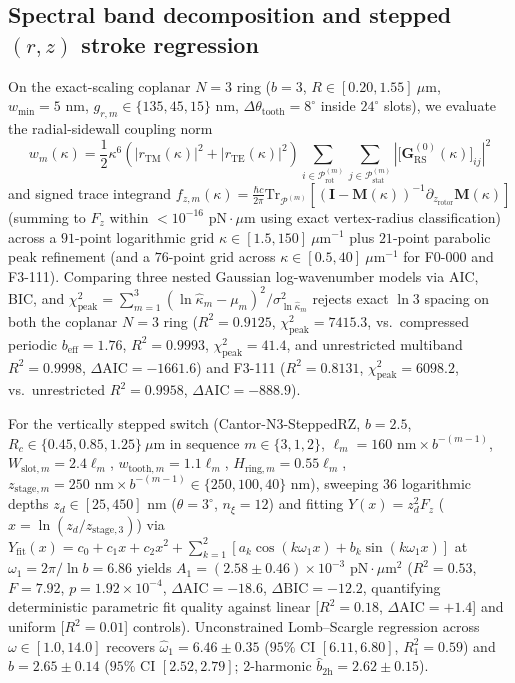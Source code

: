 \documentclass[11pt, a4paper]{article}
\begin{document}
\subsection*{Spectral band decomposition and stepped $(r,z)$ stroke regression}
On the exact-scaling coplanar $N=3$ ring ($b=3$, $R \in [0.20, 1.55]\ \mu\text{m}$, $w_{\min}=5\text{ nm}$, $g_{r,m} \in \{135, 45, 15\}\text{ nm}$, $\Delta\theta_{\mathrm{tooth}}=8^\circ$ inside $24^\circ$ slots), we evaluate the radial-sidewall coupling norm
\begin{equation}
w_m(\kappa) = \frac{1}{2}\kappa^6 \left( |r_{\mathrm{TM}}(\kappa)|^2 + |r_{\mathrm{TE}}(\kappa)|^2 \right) \sum_{i \in \mathcal{P}_{\mathrm{rot}}^{(m)}} \sum_{j \in \mathcal{P}_{\mathrm{stat}}^{(m)}} \left| \bigl[\mathbf{G}_{\mathrm{RS}}^{(0)}(\kappa)\bigr]_{ij} \right|^2
\label{eq:methods_spectral_subband}
\end{equation}
and signed trace integrand $f_{z,m}(\kappa) = \frac{\hbar c}{2\pi}\mathrm{Tr}_{\mathcal{P}^{(m)}}[(\mathbf{I}-\mathbf{M}(\kappa))^{-1}\partial_{z_{\mathrm{rotor}}}\mathbf{M}(\kappa)]$ (summing to $F_z$ within $<10^{-16}\text{ pN}\cdot\mu\text{m}$ using exact vertex-radius classification) across a $91$-point logarithmic grid $\kappa \in [1.5, 150]\ \mu\text{m}^{-1}$ plus $21$-point parabolic peak refinement (and a $76$-point grid across $\kappa \in [0.5, 40]\ \mu\text{m}^{-1}$ for F0-000 and F3-111). Comparing three nested Gaussian log-wavenumber models via AIC, BIC, and $\chi^2_{\mathrm{peak}} = \sum_{m=1}^{3}(\ln\hat{\kappa}_m - \mu_m)^2/\sigma_{\ln\hat{\kappa}_m}^2$ rejects exact $\ln 3$ spacing on both the coplanar $N=3$ ring ($R^2 = 0.9125$, $\chi^2_{\mathrm{peak}} = 7415.3$, vs.\ compressed periodic $b_{\mathrm{eff}} = 1.76$, $R^2 = 0.9993$, $\chi^2_{\mathrm{peak}} = 41.4$, and unrestricted multiband $R^2 = 0.9998$, $\Delta\mathrm{AIC} = -1661.6$) and F3-111 ($R^2 = 0.8131$, $\chi^2_{\mathrm{peak}} = 6098.2$, vs.\ unrestricted $R^2 = 0.9958$, $\Delta\mathrm{AIC} = -888.9$).

For the vertically stepped switch (Cantor-N3-SteppedRZ, $b=2.5$, $R_c \in \{0.45, 0.85, 1.25\}\ \mu\text{m}$ in sequence $m \in \{3,1,2\}$, $\ell_m = 160\text{ nm} \times b^{-(m-1)}$, $W_{\mathrm{slot},m} = 2.4\ell_m$, $w_{\mathrm{tooth},m} = 1.1\ell_m$, $H_{\mathrm{ring},m} = 0.55\ell_m$, $z_{\mathrm{stage},m} = 250\text{ nm} \times b^{-(m-1)} \in \{250, 100, 40\}\text{ nm}$), sweeping $36$ logarithmic depths $z_d \in [25, 450]\text{ nm}$ ($\theta=3^\circ$, $n_\xi=12$) and fitting $Y(x) = z_d^2 F_z$ ($x = \ln(z_d/z_{\mathrm{stage},3})$) via $Y_{\mathrm{fit}}(x) = c_0 + c_1 x + c_2 x^2 + \sum_{k=1}^{2}[a_k\cos(k\omega_1 x) + b_k\sin(k\omega_1 x)]$ at $\omega_1 = 2\pi/\ln b = 6.86$ yields $A_1 = (2.58 \pm 0.46)\times 10^{-3}\text{ pN}\cdot\mu\text{m}^2$ ($R^2 = 0.53$, $F = 7.92$, $p = 1.92\times 10^{-4}$, $\Delta\mathrm{AIC} = -18.6$, $\Delta\mathrm{BIC} = -12.2$, quantifying deterministic parametric fit quality against linear [$R^2 = 0.18$, $\Delta\mathrm{AIC} = +1.4$] and uniform [$R^2 = 0.01$] controls). Unconstrained Lomb--Scargle regression across $\omega \in [1.0, 14.0]$ recovers $\hat{\omega}_1 = 6.46 \pm 0.35$ ($95\%\text{ CI }[6.11, 6.80]$, $R^2_1 = 0.59$) and $\hat{b} = 2.65 \pm 0.14$ ($95\%\text{ CI }[2.52, 2.79]$; 2-harmonic $\hat{b}_{2\mathrm{h}} = 2.62 \pm 0.15$).
\end{document}
